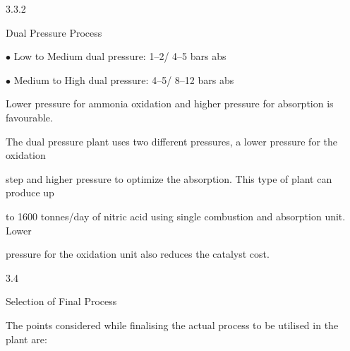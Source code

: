 \documentclass[a4paper,portrait,12pt]{article}
\begin{document}
3.3.2





\begin{flushleft}
Dual Pressure Process
\end{flushleft}





\begin{flushleft}
$\bullet$ Low to Medium dual pressure: 1--2/ 4--5 bars abs
\end{flushleft}


\begin{flushleft}
$\bullet$ Medium to High dual pressure: 4--5/ 8--12 bars abs
\end{flushleft}





\begin{flushleft}
Lower pressure for ammonia oxidation and higher pressure for absorption is favourable.
\end{flushleft}


\begin{flushleft}
The dual pressure plant uses two different pressures, a lower pressure for the oxidation
\end{flushleft}


\begin{flushleft}
step and higher pressure to optimize the absorption. This type of plant can produce up
\end{flushleft}


\begin{flushleft}
to 1600 tonnes/day of nitric acid using single combustion and absorption unit. Lower
\end{flushleft}


\begin{flushleft}
pressure for the oxidation unit also reduces the catalyst cost.
\end{flushleft}





3.4





\begin{flushleft}
Selection of Final Process
\end{flushleft}





\begin{flushleft}
The points considered while finalising the actual process to be utilised in the plant are:
\end{flushleft}
\end{document}
